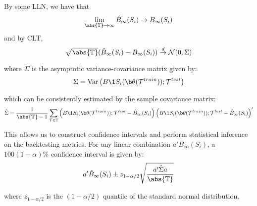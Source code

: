 \begin{enumerate}
By some LLN, we have that 
$$\lim_{\abs{\mathbb{T}} \to \infty} \hat B_{\infty}(S_i) \to  B_{\infty}(S_i) $$
and by CLT, 
$$
\sqrt{\abs{\mathbb{T}}}(\hat B_{\infty}(S_i) - B_{\infty}(S_i)) \overset{d}{\to} \mathcal{N}(0, \Sigma)
$$

where $\Sigma$ is the asymptotic variance-covariance matrix given by:
$$
\Sigma = \text{Var}\left(B\1{S_i(\b \theta(\mathcal T^{train})) ; \mathcal T^{test}}\right)
$$

which can be consistently estimated by the sample covariance matrix:
$$
\hat{\Sigma} = \frac{1}{\abs{\mathbb{T}}-1} \sum_{\mathcal T\in \mathbb{T}} 
\left(B\1{S_i(\b \theta(\mathcal T^{train})) ; \mathcal T^{test}} - \hat B_{\infty}(S_i)\right)
\left(B\1{S_i(\b \theta(\mathcal T^{train})) ; \mathcal T^{test}} - \hat B_{\infty}(S_i)\right)'
$$

This allows us to construct confidence intervals and perform statistical inference on the backtesting metrics. For any linear combination $a'B_{\infty}(S_i)$, a $100(1-\alpha)\%$ confidence interval is given by:
$$
a'\hat B_{\infty}(S_i) \pm z_{1-\alpha/2}\sqrt{\frac{a'\hat{\Sigma}a}{\abs{\mathbb{T}}}}
$$

where $z_{1-\alpha/2}$ is the $(1-\alpha/2)$ quantile of the standard normal distribution.
\end{enumerate}


